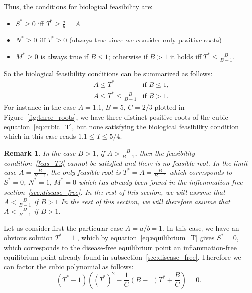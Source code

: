\documentclass[a4paper, 12pt]{article}
\newtheorem{rem}{Remark}[section]
\providecommand{\DIFaddtex}[1]{{\protect\color{blue} \sf #1}} %
\providecommand{\DIFdeltex}[1]{{\protect\color{red} \scriptsize #1}} %
\providecommand{\DIFaddbegin}{} %
\providecommand{\DIFaddend}{} %
\providecommand{\DIFdelbegin}{} %
\providecommand{\DIFdelend}{} %
\providecommand{\DIFadd}[1]{\texorpdfstring{\DIFaddtex{#1}}{#1}} %
\providecommand{\DIFdel}[1]{\texorpdfstring{\DIFdeltex{#1}}{}} %
\begin{document}
Thus, the conditions for biological feasibility are:
\begin{itemize}
\item $S^* \geq 0$ iff $T^* \geq \frac{a}{b} = A$  
\item $N^* \geq 0$  iff $T^* \geq 0$ (always true since we consider only positive roots)
\item $M^* \geq 0$ is always true if $B \leq 1$; otherwise if $B > 1$ it holds iff $T^* \leq  \frac{B}{B-1}$.
\end{itemize}
So the biological feasibility conditions can be summarized as follows:
\begin{align}
&A  \leq  T^*   &\text{if } B \leq 1, \label{feas_T1} \\
&A  \leq  T^*   \leq  \frac{B}{B-1}&  \text{if } B > 1. \label{feas_T2}
\end{align}
\DIFaddbegin \DIFadd{For instance in the case $A=1.1$, $B=5$, $C=2/3$ plotted in Figure~\ref{fig:three_roots}, we have three distinct positive roots of the cubic equation~\eqref{eq:cubic_T},
but none satisfying the biological feasibility condition which  in this case reads $1.1 \leq T \leq 5/4$.%
}\DIFaddend \begin{rem}\DIFaddbegin \label{rem:feasibility}
\DIFaddend In the case $B>1$, if $A > \frac{B}{B-1}$, then     the feasibility condition~\eqref{feas_T2} cannot be satisfied and there is no feasible root. In the limit case $A = \frac{B}{B-1}$, the only feasible root is $T^* = A = \frac{B}{B-1}$
 which corresponds to $S^* = 0$, $N^* = 1$, $M^* = 0$ which has already been found in the inflammation-free section~\ref{sec:disease_free}. 
 \DIFdelbegin \DIFdel{In the rest of this section, we will assume that $A < \frac{B}{B-1}$ if $B > 1$}\DIFdelend \DIFaddbegin \DIFadd{\emph{In the rest of this section, we will therefore assume that $A < \frac{B}{B-1}$ if $B > 1$}}\DIFaddend .
\end{rem}
Let us consider first the particular case $A = a/b = 1$. In this case, we have an obvious solution $T^* = 1$\DIFaddbegin \DIFadd{, which by equation~\eqref{eq:equilibrium_T} gives  $S^* = 0$,
}\DIFaddend which corresponds to \DIFdelbegin \DIFdel{the disease-free equilibrium point }\DIFdelend \DIFaddbegin \DIFadd{an inflammation-free equilibrium point already found in subsection~\ref{sec:disease_free}}\DIFaddend .
Therefore we can factor the cubic polynomial as follows:
    \begin{equation}
    (T^* - 1) \left( {(T^*)}^2 - \frac{1}{C} (B - 1) T^* + \frac{B}{C} \right) = 0.
    \label{eq:factored_cubic}
    \end{equation}
\end{document}
